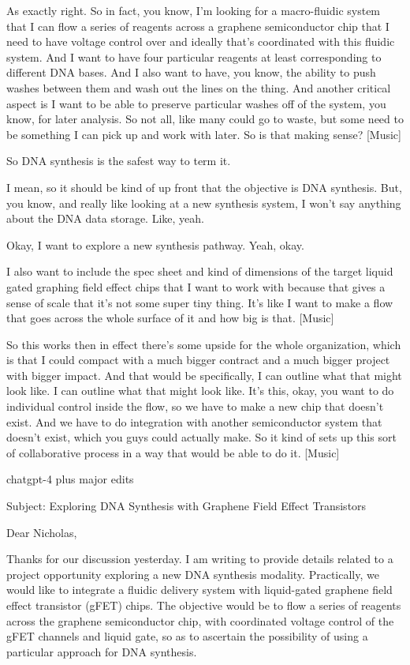 As exactly right. So in fact, you know, I'm looking for a macro-fluidic system that I can flow a series of reagents across a graphene semiconductor chip that I need to have voltage control over and ideally that's coordinated with this fluidic system. And I want to have four particular reagents at least corresponding to different DNA bases. And I also want to have, you know, the ability to push washes between them and wash out the lines on the thing. And another critical aspect is I want to be able to preserve particular washes off of the system, you know, for later analysis. So not all, like many could go to waste, but some need to be something I can pick up and work with later. So is that making sense? [Music]

So DNA synthesis is the safest way to term it.

I mean, so it should be kind of up front that the objective is DNA synthesis. But, you know, and really like looking at a new synthesis system, I won't say anything about the DNA data storage. Like, yeah.

Okay, I want to explore a new synthesis pathway. Yeah, okay.

I also want to include the spec sheet and kind of dimensions of the target liquid gated graphing field effect chips that I want to work with because that gives a sense of scale that it's not some super tiny thing. It's like I want to make a flow that goes across the whole surface of it and how big is that. [Music]

So this works then in effect there's some upside for the whole organization, which is that I could compact with a much bigger contract and a much bigger project with bigger impact. And that would be specifically, I can outline what that might look like. I can outline what that might look like. It's this, okay, you want to do individual control inside the flow, so we have to make a new chip that doesn't exist. And we have to do integration with another semiconductor system that doesn't exist, which you guys could actually make. So it kind of sets up this sort of collaborative process in a way that would be able to do it. [Music]

chatgpt-4 plus major edits

Subject: Exploring DNA Synthesis with Graphene Field Effect Transistors

Dear Nicholas,

Thanks for our discussion yesterday. I am writing to provide details related to a project opportunity exploring a new DNA synthesis modality. Practically, we would like to integrate a fluidic delivery system with liquid-gated graphene field effect transistor (gFET) chips. The objective would be to flow a series of reagents across the graphene semiconductor chip, with coordinated voltage control of the gFET channels and liquid gate, so as to ascertain the possibility of using a particular approach for DNA synthesis.

